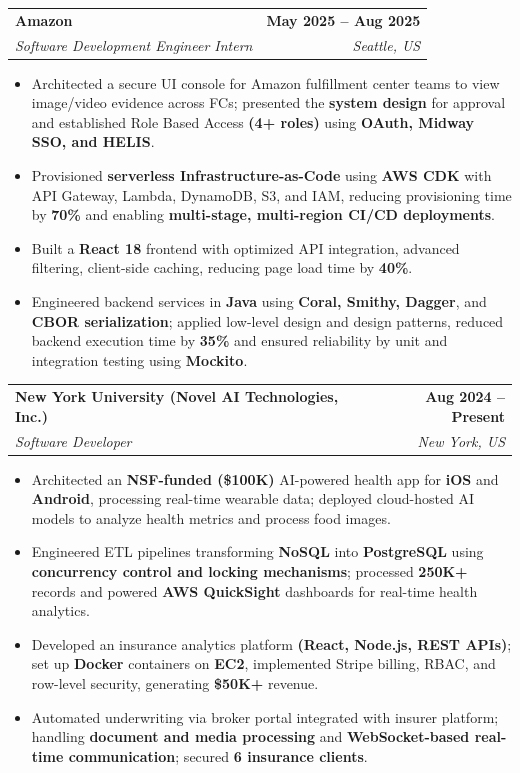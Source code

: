 \documentclass[letterpaper,10pt]{article}
\makeatletter
\newcommand{\resumeItem}[1]{
\item\small{{#1}\vspace{-3.5pt}}
}
\newcommand{\resumeSubheading}[4]{
\vspace{6pt}
\item
\begin{tabular*}{1.0\textwidth}[t]{l@{\extracolsep{\fill}}r}
\textbf{#1} & \textbf{\small #2} \\
\textit{\small#3} & \textit{\small #4} \\
\end{tabular*}\vspace{-5.5pt}
}
\newcommand{\resumeItemListStart}{\begin{itemize}[leftmargin=*, itemsep=0pt, topsep=0pt]}
\newcommand{\resumeItemListEnd}{\end{itemize}\vspace{-3pt}}
\makeatother
\begin{document}
\resumeSubheading
  {Amazon}{May 2025 -- Aug 2025}
  {Software Development Engineer Intern}{Seattle, US}
\resumeItemListStart
  \resumeItem{Architected a secure UI console for Amazon fulfillment center teams to view image/video evidence across FCs; presented the \textbf{system design} for approval and established Role Based Access \textbf{(4+ roles)} using \textbf{OAuth, Midway SSO, and HELIS}.}
  \resumeItem{Provisioned \textbf{serverless Infrastructure-as-Code} using \textbf{AWS CDK} with API Gateway, Lambda, DynamoDB, S3, and IAM, reducing provisioning time by \textbf{70\%} and enabling \textbf{multi-stage, multi-region CI/CD deployments}.}
  \resumeItem{Built a \textbf{React 18} frontend with optimized API integration, advanced filtering, client-side caching, reducing page load time by \textbf{40\%}.}
  \resumeItem{Engineered backend services in \textbf{Java} using \textbf{Coral, Smithy, Dagger}, and \textbf{CBOR serialization}; applied low-level design and design patterns, reduced backend execution time by \textbf{35\%} and ensured reliability by unit and integration testing using \textbf{Mockito}.}
\resumeItemListEnd

\resumeSubheading
  {New York University (Novel AI Technologies, Inc.)}{Aug 2024 -- Present}
  {Software Developer}{New York, US}
\resumeItemListStart
  \resumeItem{Architected an \textbf{NSF-funded (\$100K)} AI-powered health app for \textbf{iOS} and \textbf{Android}, processing real-time wearable data; deployed cloud-hosted AI models to analyze health metrics and process food images.}
  \resumeItem{Engineered ETL pipelines transforming \textbf{NoSQL} into \textbf{PostgreSQL} using \textbf{concurrency control and locking mechanisms}; processed \textbf{250K+} records and powered \textbf{AWS QuickSight} dashboards for real-time health analytics.}
  \resumeItem{Developed an insurance analytics platform \textbf{(React, Node.js, REST APIs)}; set up \textbf{Docker} containers on \textbf{EC2}, implemented Stripe billing, RBAC, and row-level security, generating \textbf{\$50K+} revenue.}
  \resumeItem{Automated underwriting via broker portal integrated with insurer platform; handling \textbf{document and media processing} and \textbf{WebSocket-based real-time communication}; secured \textbf{6 insurance clients}.}
\resumeItemListEnd
\end{document}

